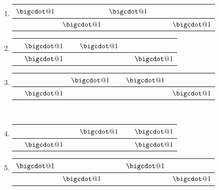 \documentclass[11pt, leqno]{article}
\makeatletter
\newcommand*\bigcdot{\mathpalette\bigcdot@{1}}
\newcommand*\bigcdot@[2]{\mathbin{\vcenter{\hbox{\scalebox{#2}{$\m@th#1\bullet$}}}}}
\makeatother
\begin{document}
\begin{enumerate}
    \item[0] \begin{center} \begin{tabular}{ |c|c|c|c|c|c| } 
            \hline
            $\bigcdot$ & $\ $ & $\bigcdot$ & $ $ & $ $ & $\ $ \\
            \hline
            $ $ & $\bigcdot$ & $ $ & $\ $ & $\ $ & $\bigcdot$ \\
            \hline
        \end{tabular} \end{center}
    \item[1] \begin{center} \begin{tabular}{ |c|c|c|c|c|c| } 
        \hline
        $ $ & $\bigcdot$ & $ $ & $\bigcdot$ & $ $ & $\ $ \\
        \hline
        $\ $ & $\bigcdot$ & $\ $ & $\ $ & $\ $ & $\bigcdot$ \\
        \hline
    \end{tabular} \end{center}
    \item[2] \begin{center} \begin{tabular}{ |c|c|c|c|c|c| } 
        \hline
        $ $ & $\ $ & $\bigcdot$ & $ $ & $\bigcdot$ & $\ $ \\
        \hline
        $\ $ & $\bigcdot$ & $ $ & $\ $ & $\ $ & $\bigcdot$ \\
        \hline
    \end{tabular}\\ \end{center}
    \item[3] \begin{center} \begin{tabular}{ |c|c|c|c|c|c| } 
        \hline
        $ $ & $\ $ & $ $ & $\bigcdot$ & $ $ & $\bigcdot$ \\
        \hline
        $\ $ & $\bigcdot$ & $\ $ & $\ $ & $\ $ & $\bigcdot$ \\
        \hline
    \end{tabular} \end{center}
    \item[4] \begin{center} \begin{tabular}{ |c|c|c|c|c|c| } 
        \hline
        $\bigcdot$ & $ $ & $ $ & $ $ & $\bigcdot$ & $\ $\\
        \hline
        $ $ & $\bigcdot$ & $\ $ & $\ $ & $\ $ & $\bigcdot$\\

\end{tabular}
\end{center}
\end{enumerate}
\end{document}
